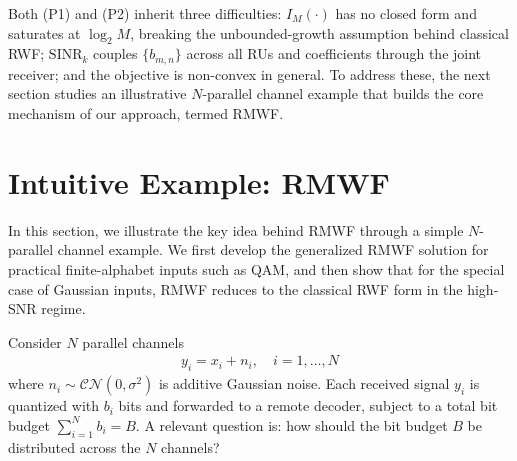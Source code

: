 \documentclass[10pt, twocolumn, comsoc]{IEEEtran}
\begin{document}
Both (P1) and (P2) inherit three difficulties:
$I_M(\cdot)$ has no closed form and saturates at $\log_2 M$, breaking the unbounded-growth assumption behind classical RWF; $\mathrm{SINR}_k$ couples $\{b_{m,n}\}$ across all RUs and coefficients through the joint receiver; and the objective is non-convex in general. To address these, the next section studies an illustrative $N$-parallel channel example that builds the core mechanism of our approach, termed RMWF.





\section{Intuitive Example: RMWF} \label{sec:toy_fa}



In this section, we illustrate the key idea behind RMWF through a simple $N$-parallel channel example. 
We first develop the generalized RMWF solution for practical finite-alphabet inputs such as QAM, and then show that for the special case of Gaussian inputs, RMWF reduces to the classical RWF form in the high-SNR regime.

Consider $N$ parallel channels
\begin{align}
  y_i = x_i + n_i, \quad i = 1,\ldots, N
\end{align}
where $n_i \sim \mathcal{CN}(0, \sigma^2)$ is additive Gaussian noise. Each received signal $y_i$ is quantized 
with $b_i$ bits and forwarded to a remote decoder, subject to a total bit budget $\sum_{i=1}^N b_i = B$. 
A relevant question is: how should the bit budget $B$ be distributed across the $N$ channels?
\end{document}
